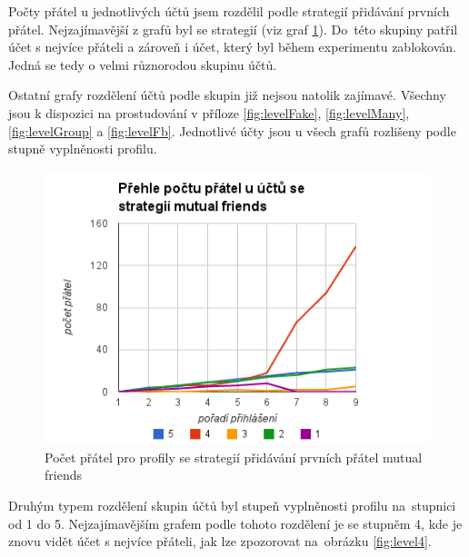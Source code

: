 \documentclass[thesis=M,czech]{FITthesis}[2013/05/10]
\begin{document}
Počty přátel u jednotlivých účtů jsem rozdělil podle strategií přidávání prvních přátel. Nejzajímavější z grafů byl se strategií (viz graf \ref{fig:levelMutual}). Do~této skupiny patřil účet s nejvíce přáteli a zároveň i účet, který byl během experimentu zablokován. Jedná se tedy o velmi různorodou skupinu účtů. 

Ostatní grafy rozdělení účtů podle skupin již nejsou natolik zajímavé. Všechny jsou k dispozici na prostudování v příloze \ref{fig:levelFake}, \ref{fig:levelMany}, \ref{fig:levelGroup} a \ref{fig:levelFb}. Jednotlivé účty jsou u všech grafů rozlišeny podle stupně vyplněnosti profilu.

\begin{figure}[h]
\begin{center}
\includegraphics[width=5in]{figures/levelMutual.png}
\caption{Počet přátel pro profily se strategií přidávání prvních přátel mutual friends}
\label{fig:levelMutual}
\end{center}
\end{figure}


Druhým typem rozdělení skupin účtů byl stupeň vyplněnosti profilu na~stupnici od 1 do 5. Nejzajímavějším grafem podle tohoto rozdělení je se stupněm 4, kde je znovu vidět účet s nejvíce přáteli, jak lze zpozorovat na~obrázku \ref{fig:level4}. 
\end{document}
